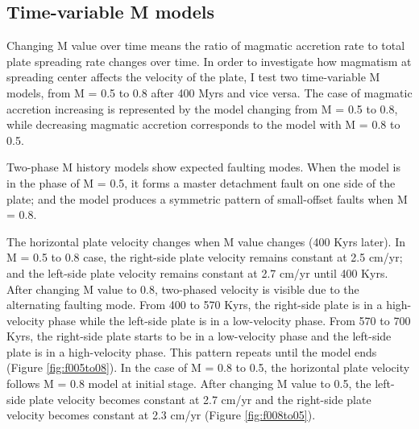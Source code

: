 \documentclass[letterpaper,12pt,notitle]{memphisthesis}                     %
\begin{document}
\subsection{Time-variable M models}

Changing M value over time means the ratio of magmatic accretion rate to total plate spreading rate changes over time. In order to investigate how magmatism at spreading center affects the velocity of the plate, I test two time-variable M models, from M = 0.5 to 0.8 after 400 Myrs and vice versa. The case of magmatic accretion increasing is represented by the model changing from M = 0.5 to 0.8, while decreasing magmatic accretion corresponds to the model with M = 0.8 to 0.5.

Two-phase M history models show expected faulting modes. When the model is in the phase of M = 0.5, it forms a master detachment fault on one side of the plate; and the model produces a symmetric pattern of small-offset faults when M = 0.8.

The horizontal plate velocity changes when M value changes (400 Kyrs later). In M = 0.5 to 0.8 case, the right-side plate velocity remains constant at 2.5 cm/yr; and the left-side plate velocity remains constant at 2.7 cm/yr until 400 Kyrs. After changing M value to 0.8, two-phased velocity is visible due to the alternating faulting mode. From 400 to 570 Kyrs, the right-side plate is in a high-velocity phase while the left-side plate is in a low-velocity phase. From 570 to 700 Kyrs, the right-side plate starts to be in a low-velocity phase and the left-side plate is in a high-velocity phase. This pattern repeats until the model ends (Figure \ref{fig:f005to08}). In the case of M = 0.8 to 0.5, the horizontal plate velocity follows M = 0.8 model at initial stage. After changing M value to 0.5, the left-side plate velocity becomes constant at 2.7 cm/yr and the right-side plate velocity becomes constant at 2.3 cm/yr (Figure \ref{fig:f008to05}).
\end{document}
